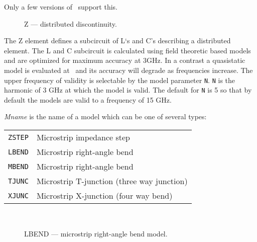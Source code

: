 Only a few versions of \spice\ support this.
\begin{figure}[h]
\centering
\epsfxsize=2in 
\caption{Z --- distributed discontinuity.}
\end{figure}

The Z element defines a subcircuit of L`s and C's
describing a distributed element. The L and C subcircuit is calculated
using field theoretic based models and are optimized for maximum accuracy
at 3GHz. In a contrast a quasistatic model is evaluated at \dc\ and its
accuracy will degrade as frequencies increase.
The upper frequency of validity is selectable by the model parameter {\tt N}.
{\tt N}  is the harmonic of 3 GHz at which the model is valid.  The default
for {\tt N} is 5 so that by default the models are valid to a frequency
of 15 GHz.

{\it Mname} is the name of a model which can be one of several types:\\
\begin{tabular}{ll}
 {\tt ZSTEP}    &   Microstrip impedance step \\
 {\tt LBEND}    &   Microstrip right-angle bend \\
 {\tt MBEND}    &   Microstrip right-angle bend \\
 {\tt TJUNC}    &   Microstrip T-junction (three way junction) \\
 {\tt XJUNC}    &   Microstrip X-junction (four way bend)
 \end{tabular}
\\[0.1in]

\clearpage
%
%

\begin{figure}[h]
\centering
\epsfxsize=5in 
\caption{LBEND --- microstrip right-angle bend model.}
\end{figure}



